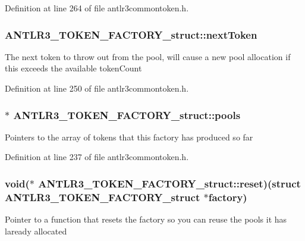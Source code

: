 Definition at line 264 of file antlr3commontoken.\-h.

\hypertarget{struct_a_n_t_l_r3___t_o_k_e_n___f_a_c_t_o_r_y__struct_a80b13cdd84923d749e14df702a03664d}{
\subsubsection[{next\-Token}]{ A\-N\-T\-L\-R3\-\_\-\-T\-O\-K\-E\-N\-\_\-\-F\-A\-C\-T\-O\-R\-Y\-\_\-struct\-::next\-Token}}\label{struct_a_n_t_l_r3___t_o_k_e_n___f_a_c_t_o_r_y__struct_a80b13cdd84923d749e14df702a03664d}
The next token to throw out from the pool, will cause a new pool allocation if this exceeds the available token\-Count 

Definition at line 250 of file antlr3commontoken.\-h.

\hypertarget{struct_a_n_t_l_r3___t_o_k_e_n___f_a_c_t_o_r_y__struct_ab9e726d32971c19670422fc957a4e224}{
\subsubsection[{pools}]{$\ast$ A\-N\-T\-L\-R3\-\_\-\-T\-O\-K\-E\-N\-\_\-\-F\-A\-C\-T\-O\-R\-Y\-\_\-struct\-::pools}}\label{struct_a_n_t_l_r3___t_o_k_e_n___f_a_c_t_o_r_y__struct_ab9e726d32971c19670422fc957a4e224}
Pointers to the array of tokens that this factory has produced so far 

Definition at line 237 of file antlr3commontoken.\-h.

\hypertarget{struct_a_n_t_l_r3___t_o_k_e_n___f_a_c_t_o_r_y__struct_a8ca6227695d2d0bbcbe4bfa6dfc719f7}{
\subsubsection[{reset}]{\setlength{\rightskip}{0pt plus 5cm}void($\ast$ A\-N\-T\-L\-R3\-\_\-\-T\-O\-K\-E\-N\-\_\-\-F\-A\-C\-T\-O\-R\-Y\-\_\-struct\-::reset)(struct {\bf A\-N\-T\-L\-R3\-\_\-\-T\-O\-K\-E\-N\-\_\-\-F\-A\-C\-T\-O\-R\-Y\-\_\-struct} $\ast$factory)}}\label{struct_a_n_t_l_r3___t_o_k_e_n___f_a_c_t_o_r_y__struct_a8ca6227695d2d0bbcbe4bfa6dfc719f7}
Pointer to a function that resets the factory so you can reuse the pools it has laready allocated 

